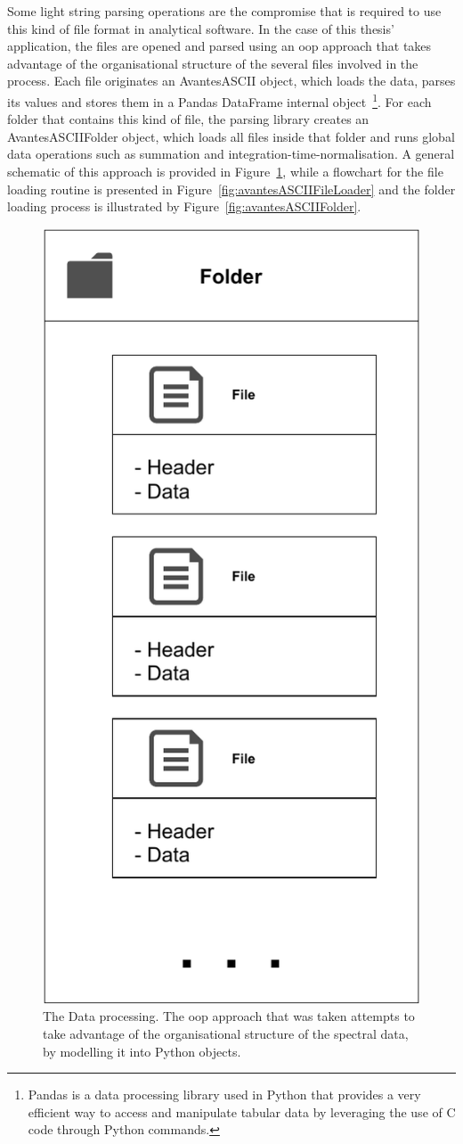 Some light string parsing operations are the compromise that is required
to use this kind of file format in analytical software. In the case of
this thesis' application, the files are opened and parsed using an
\gls{oop} approach that takes advantage of the organisational structure
of the several files involved in the process. Each file originates an
AvantesASCII object, which loads the data, parses its values and stores
them in a Pandas DataFrame internal object~\footnote{Pandas is a data
processing library used in Python that provides a very efficient way to
access and manipulate tabular data by leveraging the use of C code
through Python commands.}. For each folder that contains this kind of
file, the parsing library creates an AvantesASCIIFolder object, which
loads all files inside that folder and runs global data operations such
as summation and integration-time-normalisation. A general schematic of
this approach is provided in Figure~\ref{fig:data_processing_general},
while a flowchart for the file loading routine is presented in
Figure~\ref{fig:avantesASCIIFileLoader} and the folder loading process
is illustrated by Figure~\ref{fig:avantesASCIIFolder}.

\begin{figure}[htpb]
    \centering
    \includegraphics[width=0.3\linewidth]{img/pdf/data_processing_general.pdf}
    \caption{The Data processing. The \gls{oop} approach that was taken
    attempts to take advantage of the organisational structure of the
    spectral data, by modelling it into Python objects.}
    \label{fig:data_processing_general}
\end{figure}

